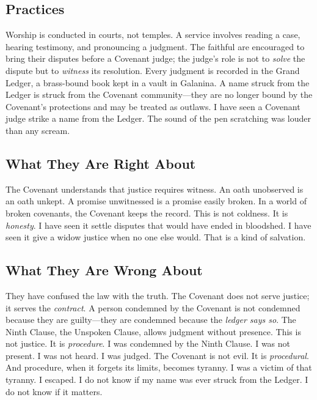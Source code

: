 \documentclass{book}
\begin{document}
\subsection{Practices}

Worship is conducted in courts, not temples. A service involves reading a case, hearing testimony, and pronouncing a judgment. The faithful are encouraged to bring their disputes before a Covenant judge; the judge's role is not to \textit{solve} the dispute but to \textit{witness} its resolution. Every judgment is recorded in the Grand Ledger, a brass-bound book kept in a vault in Galanina. A name struck from the Ledger is struck from the Covenant community---they are no longer bound by the Covenant's protections and may be treated as outlaws. I have seen a Covenant judge strike a name from the Ledger. The sound of the pen scratching was louder than any scream.

\subsection{What They Are Right About}

The Covenant understands that justice requires witness. An oath unobserved is an oath unkept. A promise unwitnessed is a promise easily broken. In a world of broken covenants, the Covenant keeps the record. This is not coldness. It is \textit{honesty}. I have seen it settle disputes that would have ended in bloodshed. I have seen it give a widow justice when no one else would. That is a kind of salvation.

\subsection{What They Are Wrong About}

They have confused the law with the truth. The Covenant does not serve justice; it serves the \textit{contract}. A person condemned by the Covenant is not condemned because they are guilty---they are condemned because the \textit{ledger says so}. The Ninth Clause, the Unspoken Clause, allows judgment without presence. This is not justice. It is \textit{procedure}. I was condemned by the Ninth Clause. I was not present. I was not heard. I was judged. The Covenant is not evil. It is \textit{procedural}. And procedure, when it forgets its limits, becomes tyranny. I was a victim of that tyranny. I escaped. I do not know if my name was ever struck from the Ledger. I do not know if it matters.
\end{document}
